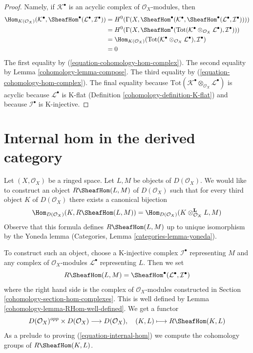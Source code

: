 \begin{proof}

Namely, if $\mathcal{K}^\bullet$ is an acyclic complex of
$\mathcal{O}_X$-modules, then
\begin{align*}
\Hom_{K(\mathcal{O}_X)}(\mathcal{K}^\bullet,
\SheafHom^\bullet(\mathcal{L}^\bullet, \mathcal{I}^\bullet))
& =
H^0(\Gamma(X,
\SheafHom^\bullet(\mathcal{K}^\bullet,
\SheafHom^\bullet(\mathcal{L}^\bullet, \mathcal{I}^\bullet)))) \\
& =
H^0(\Gamma(X, \SheafHom^\bullet(\text{Tot}(
\mathcal{K}^\bullet \otimes_{\mathcal{O}_X} \mathcal{L}^\bullet),
\mathcal{I}^\bullet))) \\
& =
\Hom_{K(\mathcal{O}_X)}(
\text{Tot}(\mathcal{K}^\bullet \otimes_{\mathcal{O}_X} \mathcal{L}^\bullet),
\mathcal{I}^\bullet) \\
& =
0
\end{align*}
The first equality by (\ref{equation-cohomology-hom-complex}).
The second equality by Lemma \ref{cohomology-lemma-compose}.
The third equality by (\ref{equation-cohomology-hom-complex}).
The final equality because
$\text{Tot}(\mathcal{K}^\bullet \otimes_{\mathcal{O}_X} \mathcal{L}^\bullet)$
is acyclic because $\mathcal{L}^\bullet$ is K-flat
(Definition \ref{cohomology-definition-K-flat}) and because $\mathcal{I}^\bullet$
is K-injective.
\end{proof}

\section{Internal hom in the derived category}
\label{cohomology-section-internal-hom}
Let $(X, \mathcal{O}_X)$ be a ringed space. Let $L, M$ be objects
of $D(\mathcal{O}_X)$. We would like to construct an object
$R\SheafHom(L, M)$ of $D(\mathcal{O}_X)$ such that for every third
object $K$ of $D(\mathcal{O}_X)$ there exists a canonical bijection
\begin{equation}
\label{equation-internal-hom}
\Hom_{D(\mathcal{O}_X)}(K, R\SheafHom(L, M))
=
\Hom_{D(\mathcal{O}_X)}(K \otimes_{\mathcal{O}_X}^\mathbf{L} L, M)
\end{equation}
Observe that this formula defines $R\SheafHom(L, M)$ up to unique
isomorphism by the Yoneda lemma
(Categories, Lemma \ref{categories-lemma-yoneda}).

\medskip\noindent
To construct such an object, choose a K-injective complex
$\mathcal{I}^\bullet$ representing $M$ and any complex of
$\mathcal{O}_X$-modules $\mathcal{L}^\bullet$ representing $L$.
Then we set
$$
R\SheafHom(L, M) = \SheafHom^\bullet(\mathcal{L}^\bullet, \mathcal{I}^\bullet)
$$
where the right hand side is the complex of $\mathcal{O}_X$-modules
constructed in Section \ref{cohomology-section-hom-complexes}.
This is well defined by Lemma \ref{cohomology-lemma-RHom-well-defined}.
We get a functor
$$
D(\mathcal{O}_X)^{opp} \times D(\mathcal{O}_X) \longrightarrow D(\mathcal{O}_X),
\quad
(K, L) \longmapsto R\SheafHom(K, L)
$$
As a prelude to proving (\ref{equation-internal-hom})
we compute the cohomology groups of $R\SheafHom(K, L)$.

